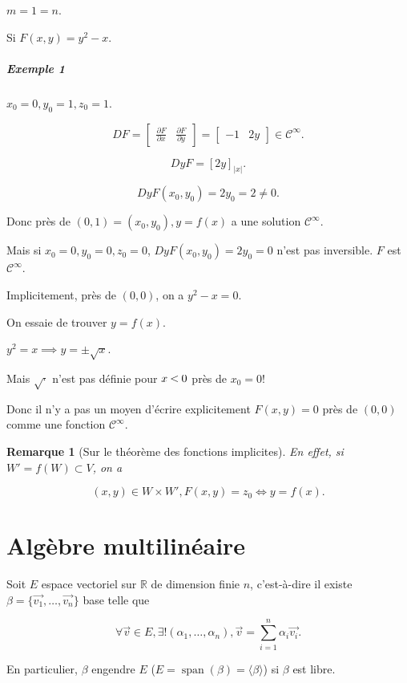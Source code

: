 \documentclass[french]{article}
\newtheorem*{remark}{Remarque}
\newcommand{\lesss}{\rotatebox[origin=c]{90}{$\land$}}
\newcommand{\less}{\ \lesss\ }
\begin{document}
$m=1=n$.

Si $F(x, y) = y ^2-x$.

\subparagraph{Exemple 1} $x_0 = 0, y_0 =1 , z_0 =1$.

\[
DF = \left[\begin{matrix}
  \frac{\partial F }{\partial x} & \frac{\partial F }{\partial y }
\end{matrix}\right] = \left[\begin{matrix}
  -1 & 2y
\end{matrix}\right] \in \mathcal{C}^\infty.
\]

\[
DyF = [2y] _{|x|}.
\]

\[
DyF(x_0, y_0) = 2 y_0 = 2 \neq 0.
\]

Donc près de $(0, 1) = (x_0, y_0), y= f(x)$ a une solution $\mathcal{C} ^{\infty}$.

Mais si $x_0 = 0, y_0 = 0, z_0 = 0$, $DyF(x_0, y_0)=2y_0=0$ n'est pas inversible. $F$ est $\mathcal{C}^\infty$.

Implicitement, près de $(0, 0)$, on a $y ^2 - x = 0$.

On essaie de trouver $y=f(x)$.

$y ^2 = x \implies y = \pm \sqrt{ x } $.

Mais $\sqrt{\cdot} $ n'est pas définie pour $x \less 0$ près de $x_0 = 0$!

Donc il n'y a pas un moyen d'écrire explicitement $F(x,y) = 0$ près de $(0, 0)$ comme une fonction $\mathcal{C}^\infty$.

\begin{remark}[Sur le théorème des fonctions implicites]
  En effet, si $W' = f(W) \subset V$, on a

  \[
  (x,y) \in W \times W', F(x,y) = z_0 \iff y=f(x).
  \]
\end{remark}

\section{Algèbre multilinéaire}

Soit $E$ espace vectoriel sur $\mathbb{R}$ de dimension finie $n$, c'est-à-dire il existe $\beta = \{ \overrightarrow{ v_1 }, \dots, \overrightarrow{ v_n }   \} $ base telle que

\[
\forall \overrightarrow{ v } \in E, \exists ! (\alpha_1, \dots, \alpha_n), \overrightarrow{ v } = \sum_{i=1}^{n} \alpha_i \overrightarrow{ v_i }.
\]

En particulier, $\beta $ engendre $E$ ($E = \operatorname{span}(\beta) = \langle \beta \rangle $) si $\beta$ est libre.
\end{document}
